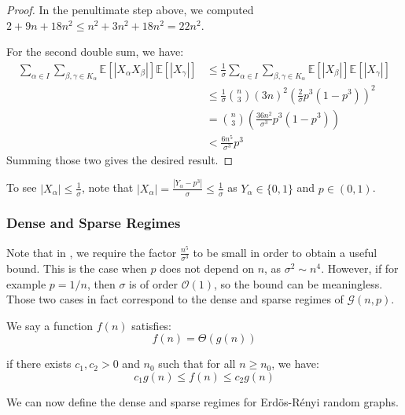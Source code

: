 \documentclass{article}
\begin{document}
\begin{proof}
    In the penultimate step above, we computed $2 + 9n + 18n^2 \leq n^2 + 3n^2 + 18n^2 = 22n^2$.

    For the second double sum, we have:
    \begin{align*}
        \sum_{\alpha\in I}\sum_{\beta,\gamma\in K_{\alpha}}\mathbb{E}[|X_{\alpha}X_{\beta}|]\mathbb{E}[|X_{\gamma}|] &\leq \frac{1}{\sigma}  \sum_{\alpha\in I}\sum_{\beta,\gamma\in K_{\alpha}}\mathbb{E}[|X_{\beta}|] \mathbb{E}[|X_{\gamma}|] \\
        &\leq \frac{1}{\sigma} \binom{n}{3} (3n)^2 \left(\frac{2}{\sigma}p^{3}(1-p^{3})\right)^2 \\
        &=\binom{n}{3} \left(\frac{36n^2}{\sigma^3}p^{3}(1-p^{3})\right) \\
        &< \frac{6n^5}{\sigma^3} p^3
    \end{align*}
    Summing those two gives the desired result.
\end{proof}

\begin{remark}
    To see $|X_\alpha| \leq \frac{1}{\sigma}$, note that $|X_\alpha| = \frac{|Y_\alpha - p^3|}{\sigma} \leq \frac{1}{\sigma}$ as $Y_\alpha \in \{0,1\}$ and $p\in (0,1)$.
\end{remark}

\subsubsection{Dense and Sparse Regimes}  

Note that in , we require the factor $\frac{n^5}{\sigma^3}$ to be small in order to obtain a useful bound. This is the case when $p$ does not depend on $n$, as $\sigma^2 \sim n^4$. However, if for example $p=1/n$, then $\sigma$ is of order $\mathcal{O}(1)$, so the bound can be meaningless.  Those two cases in fact correspond to the dense and sparse regimes of $\mathcal{G}(n,p)$.  

\begin{definition}
    We say a function $f(n)$ satisfies:
    \[
        f(n) = \Theta(g(n))
        \]

    if there exists $c_1, c_2 > 0$ and $n_0$ such that for all $n\geq n_0$, we have:
    \[
        c_1 g(n) \leq f(n) \leq c_2 g(n)
    \]
\end{definition}

We can now define the dense and sparse regimes for Erd\"os-R\'enyi random graphs.
\end{document}
